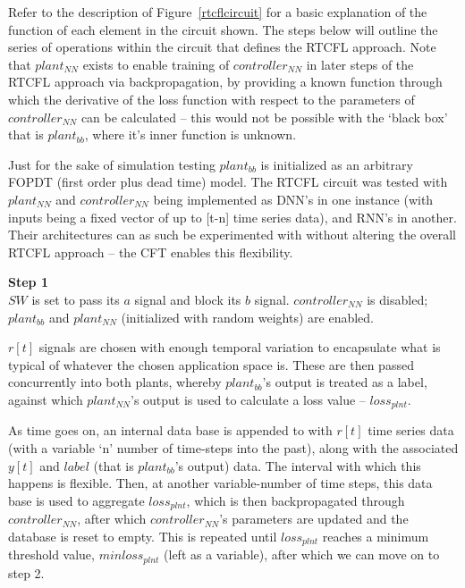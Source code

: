 \documentclass[10pt,twocolumn,letterpaper]{article}
\begin{document}
            Refer to the description of Figure~\ref{rtcflcircuit} for a basic explanation of the function of each
            element in the circuit shown. The steps below will outline the series of operations within the circuit that
            defines the RTCFL approach. Note that $plant_{NN}$ exists to enable training of $controller_{NN}$ in later
            steps of the RTCFL approach via backpropagation, by providing a known function through which the derivative
            of the loss function with respect to the parameters of $controller_{NN}$ can be calculated -- this would not
            be possible with the `black box' that is $plant_{bb}$, where it's inner function is unknown. 
            
            Just for the sake of simulation testing $plant_{bb}$ is initialized as an arbitrary FOPDT (first order plus
            dead time) model. The RTCFL circuit was tested with $plant_{NN}$ and $controller_{NN}$ being implemented as
            DNN's in one instance (with inputs being a fixed vector of up to [t-n] time series data), and RNN's in
            another. Their architectures can as such be experimented with without altering the overall RTCFL approach --
            the CFT enables this flexibility.

            \textbf{Step 1}\\
            $SW$ is set to pass its $a$ signal and block its $b$ signal. $controller_{NN}$ is disabled; $plant_{bb}$ and
            $plant_{NN}$ (initialized with random weights) are enabled.

            $r[t]$ signals are chosen with enough temporal variation to encapsulate what is typical of whatever the
            chosen application space is. These are then passed concurrently into both plants, whereby $plant_{bb}$'s
            output is treated as a label, against which $plant_{NN}$'s output is used to calculate a loss value --
            $loss_{plnt}$.

            As time goes on, an internal data base is appended to with $r[t]$ time series data (with a variable `n'
            number of time-steps into the past), along with the associated $y[t]$ and $label$ (that is $plant_{bb}$'s
            output) data. The interval with which this happens is flexible. Then, at another variable-number of time
            steps, this data base is used to aggregate $loss_{plnt}$, which is then backpropagated through
            $controller_{NN}$, after which $controller_{NN}$'s parameters are updated and the database is reset to
            empty. This is repeated until $loss_{plnt}$ reaches a minimum threshold value, $minloss_{plnt}$ (left as a
            variable), after which we can move on to step 2.
\end{document}
